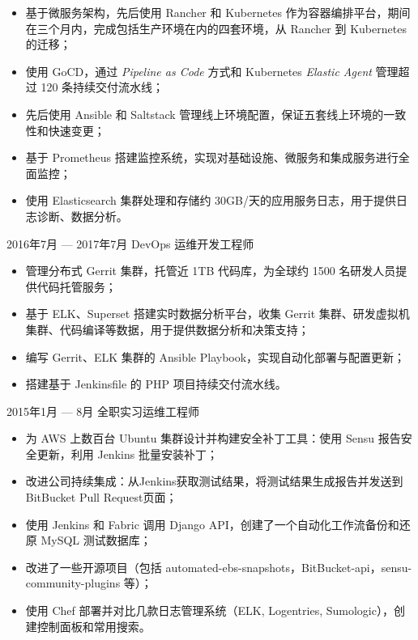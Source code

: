 \documentclass{resume}
\begin{document}
\begin{body}
\begin{itemize}[noitemsep,topsep=0pt]
\begin{itemize}[noitemsep,topsep=0pt]
			\item 基于微服务架构，先后使用 Rancher 和 Kubernetes 作为容器编排平台，期间在三个月内，完成包括生产环境在内的四套环境，从 Rancher 到 Kubernetes 的迁移；
			\item 使用 GoCD，通过 \textit{Pipeline as Code} 方式和 Kubernetes \textit{Elastic Agent} 管理超过 120 条持续交付流水线；
			\item 先后使用 Ansible 和 Saltstack 管理线上环境配置，保证五套线上环境的一致性和快速变更；
			\item 基于 Prometheus 搭建监控系统，实现对基础设施、微服务和集成服务进行全面监控；
			\item 使用 Elasticsearch 集群处理和存储约 30GB/天的应用服务日志，用于提供日志诊断、数据分析。
		\end{itemize}
	\end{itemize}
\end{body}

\begin{body}
	{2016年7月 --- 2017年7月}
	{DevOps 运维开发工程师}
	\begin{itemize}[noitemsep,topsep=0pt]
		\item 管理分布式 Gerrit 集群，托管近 1TB 代码库，为全球约 1500 名研发人员提供代码托管服务；
		\item 基于 ELK、Superset 搭建实时数据分析平台，收集 Gerrit 集群、研发虚拟机集群、代码编译等数据，用于提供数据分析和决策支持；
		\item 编写 Gerrit、ELK 集群的 Ansible Playbook，实现自动化部署与配置更新；
		\item 搭建基于 Jenkinsfile 的 PHP 项目持续交付流水线。
	\end{itemize}
\end{body}

\begin{body}
	{2015年1月 --- 8月}
	{全职实习运维工程师}
	\begin{itemize}[noitemsep,topsep=0pt]
		\item 为 AWS 上数百台 Ubuntu 集群设计并构建安全补丁工具：使用 Sensu 报告安全更新，利用 Jenkins 批量安装补丁；
		\item 改进公司持续集成：从Jenkins获取测试结果，将测试结果生成报告并发送到BitBucket Pull Request页面；
		\item 使用 Jenkins 和 Fabric 调用 Django API，创建了一个自动化工作流备份和还原 MySQL 测试数据库；
		\item 改进了一些开源项目（包括 automated-ebs-snapshots，BitBucket-api，sensu-community-plugins 等）；
		\item 使用 Chef 部署并对比几款日志管理系统（ELK, Logentries, Sumologic），创建控制面板和常用搜索。
	\end{itemize}
\end{body}
\end{document}
